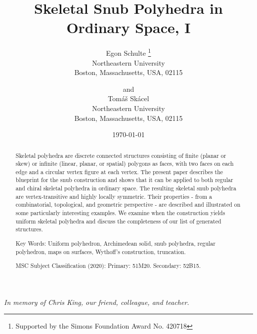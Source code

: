 \documentclass[12pt]{article}
\theoremstyle{definition}\newtheorem{definition}{Definition}[section]
\begin{document}

\title{Skeletal Snub Polyhedra in Ordinary Space, I} 
 
\author{
Egon Schulte
\thanks{Supported by the Simons Foundation Award No. 420718}\\
Northeastern University\\
Boston, Massachusetts,  USA, 02115
\and and \\[.05in]
Tom\'a\v{s} Sk\'acel\\
Northeastern University\\
Boston, Massachusetts,  USA, 02115}

\date{ \today } 
\maketitle 

\begin{center}
\textit{In memory of Chris King, our friend, colleague, and teacher.}
\end{center}
\bigskip

\begin{abstract}
Skeletal polyhedra are discrete connected structures consisting of finite (planar or skew) or infinite (linear, planar, or spatial) polygons as faces, with two faces on each edge and a circular vertex figure at each vertex. The present paper describes the blueprint for the snub construction and shows that it can be applied to both regular and chiral skeletal polyhedra in ordinary space. The resulting skeletal snub polyhedra are vertex-transitive and highly locally symmetric. Their properties - from a combinatorial, topological, and geometric perspective - are described and illustrated on some particularly interesting examples. We examine when the construction yields uniform skeletal polyhedra and discuss the completeness of our list of generated structures.   
\bigskip\medskip

\noindent
Key Words:  Uniform polyhedron, Archimedean solid, snub polyhedra, regular polyhedron, maps on surfaces, Wythoff's construction, truncation. 
\medskip

\noindent
MSC Subject Classification (2020): Primary: 51M20. Secondary: 52B15.  
\end{abstract}



\end{document}
